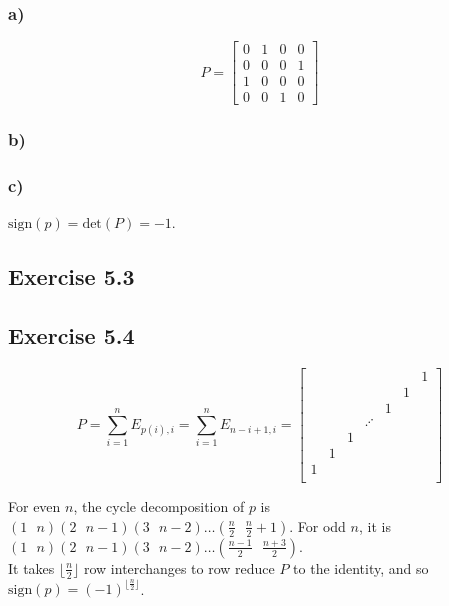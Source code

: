 \documentclass{article}
\begin{document}
\subsubsection*{a)}

\[
    P=
    \begin{bmatrix}
    0 & 1 & 0 & 0\\
    0 & 0 & 0 & 1\\
    1 & 0 & 0 & 0\\
    0 & 0 & 1 & 0
    \end{bmatrix}
\]

\subsubsection*{b)}



\subsubsection*{c)}

$\text{sign}(p)=\text{det}(P)=-1$.

\subsection*{Exercise 5.3}
\subsection*{Exercise 5.4}

\[
    P=
    \sum_{i=1}^n E_{p(i), i} = \sum_{i=1}^n E_{n-i+1, i} =
    \begin{bmatrix}
    &&&&&&1\\
    &&&&&1&\\
    &&&&1&&\\
    &&&\iddots &&&\\
    &&1&&&&\\
    &1&&&&\\
    1&&&&&\\
    \end{bmatrix}
\]

For even $n$, the cycle decomposition of $p$ is $(1\text{ }n)(2\text{ }n-1)(3\text{ }n-2)\dots (\frac{n}{2}\text{ }\frac{n}{2}+1)$. For odd $n$, it is $(1\text{ }n)(2\text{ }n-1)(3\text{ }n-2)\dots (\frac{n-1}{2}\text{ }\frac{n+3}{2})$.\\

It takes $\lfloor\frac{n}{2}\rfloor$ row interchanges to row reduce $P$ to the identity, and so $\text{sign}(p)=(-1)^{\lfloor\frac{n}{2}\rfloor}$.
\end{document}
